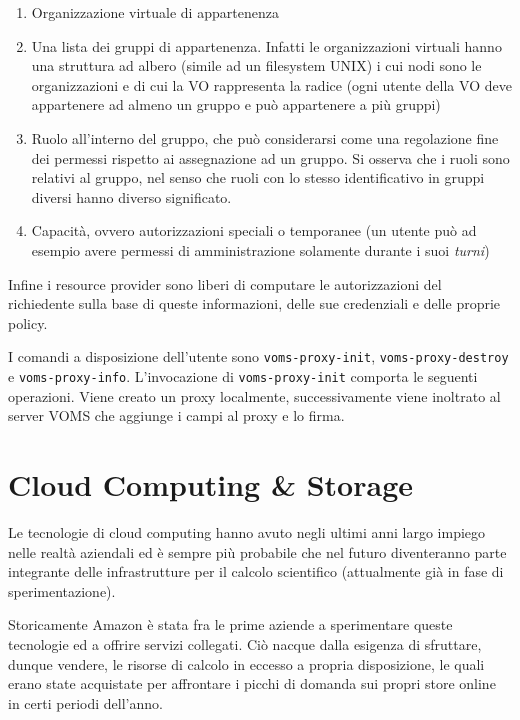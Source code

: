 \documentclass[italian,]{article}
\providecommand{\tightlist}{%
  \setlength{\itemsep}{0pt}\setlength{\parskip}{0pt}}
\begin{document}
\begin{enumerate}
\def\labelenumi{\arabic{enumi}.}
\tightlist
\item
  Organizzazione virtuale di appartenenza
\item
  Una lista dei gruppi di appartenenza. Infatti le organizzazioni
  virtuali hanno una struttura ad albero (simile ad un filesystem UNIX)
  i cui nodi sono le organizzazioni e di cui la VO rappresenta la radice
  (ogni utente della VO deve appartenere ad almeno un gruppo e può
  appartenere a più gruppi)
\item
  Ruolo all'interno del gruppo, che può considerarsi come una
  regolazione fine dei permessi rispetto ai assegnazione ad un gruppo.
  Si osserva che i ruoli sono relativi al gruppo, nel senso che ruoli
  con lo stesso identificativo in gruppi diversi hanno diverso
  significato.
\item
  Capacità, ovvero autorizzazioni speciali o temporanee (un utente può
  ad esempio avere permessi di amministrazione solamente durante i suoi
  \emph{turni})
\end{enumerate}

Infine i resource provider sono liberi di computare le autorizzazioni
del richiedente sulla base di queste informazioni, delle sue credenziali
e delle proprie policy.

I comandi a disposizione dell'utente sono \texttt{voms-proxy-init},
\texttt{voms-proxy-destroy} e \texttt{voms-proxy-info}. L'invocazione di
\texttt{voms-proxy-init} comporta le seguenti operazioni. Viene creato
un proxy localmente, successivamente viene inoltrato al server VOMS che
aggiunge i campi al proxy e lo firma.

\section{Cloud Computing \& Storage}\label{cloud-computing-storage}

Le tecnologie di cloud computing hanno avuto negli ultimi anni largo
impiego nelle realtà aziendali ed è sempre più probabile che nel futuro
diventeranno parte integrante delle infrastrutture per il calcolo
scientifico (attualmente già in fase di sperimentazione).

Storicamente Amazon è stata fra le prime aziende a sperimentare queste
tecnologie ed a offrire servizi collegati. Ciò nacque dalla esigenza di
sfruttare, dunque vendere, le risorse di calcolo in eccesso a propria
disposizione, le quali erano state acquistate per affrontare i picchi di
domanda sui propri store online in certi periodi dell'anno.
\end{document}
